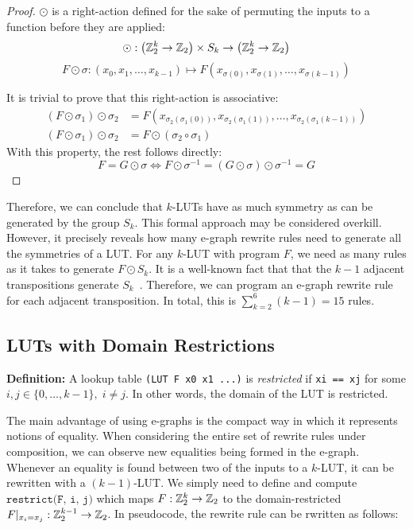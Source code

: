 \begin{proof}
    $\odot$ is a right-action defined for the sake of permuting the inputs to a function before they are applied:
    \[ \odot : \big (\mathbb{Z}_{2}^{k} \rightarrow \mathbb{Z}_2 \big ) \times S_k \rightarrow \big (\mathbb{Z}_{2}^{k} \rightarrow \mathbb{Z}_2 \big )\]
    \[ F \odot \sigma : (x_0, x_1, \ldots, x_{k-1}) \mapsto F(x_{\sigma(0)}, x_{\sigma(1)}, \ldots, x_{\sigma(k-1)}) \]

    It is trivial to prove that this right-action is associative:
    \begin{align*}
        (F \odot \sigma_1) \odot \sigma_2 & = F(x_{\sigma_2(\sigma_1(0))}, x_{\sigma_2(\sigma_1(1))}, \ldots, x_{\sigma_2(\sigma_1(k-1))}) \\
        (F \odot \sigma_1) \odot \sigma_2 & = F \odot (\sigma_2 \circ \sigma_1)
    \end{align*}
    With this property, the rest follows directly:
    \[ F = G \odot
        \sigma \iff F \odot \sigma^{-1} = (G \odot \sigma) \odot \sigma^{-1} = G \]
\end{proof}

Therefore, we can conclude that $k$-LUTs have as much symmetry as can be
generated by the group $S_k$. This formal approach may be considered overkill.
However, it precisely reveals how many e-graph rewrite rules need to generate
all the symmetries of a LUT. For any $k$-LUT with program $F$, we need as many
rules as it takes to generate $F \odot S_k$. It is a well-known fact that that
the $k-1$ adjacent transpositions generate $S_k$~\cite{sgroup}. Therefore, we
can program an e-graph rewrite rule for each adjacent transposition. In total,
this is $\sum_{k=2}^{6} (k-1) = 15$ rules.

\subsection{LUTs with Domain Restrictions}\label{sec:rewrites:restrict}

\textbf{Definition:} A lookup table \texttt{(LUT F x0 x1 ...)} is \textit{restricted} if \texttt{xi == xj} for some $ i, j \in \{0, \ldots, k-1\}, \; i \neq j$.
In other words, the domain of the LUT is restricted.

The main advantage of using e-graphs is the compact way in which it represents
notions of equality. When considering the entire set of rewrite rules under
composition, we can observe new equalities being formed in the e-graph.
Whenever an equality is found between two of the inputs to a $k$-LUT, it can be
rewritten with a $(k-1)$-LUT. We simply need to define and compute
$\texttt{restrict(F, i, j)}$ which maps $F : \mathbb{Z}_{2}^{k} \rightarrow \mathbb{Z}_{2}$ to the
domain-restricted $F \vert_{x_i = x_j} : \mathbb{Z}_{2}^{k-1} \rightarrow \mathbb{Z}_{2}$. In
pseudocode, the rewrite rule can be rwritten as follows:

